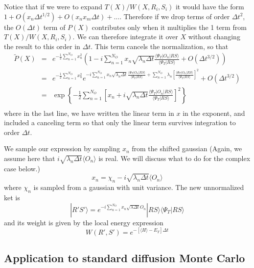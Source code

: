 Notice that if we were to expand $T(X)/W(X,R_i,S_i)$ it would
 have the form $1 + O(x_n\Delta t^{1/2}) + O(x_nx_m \Delta t)+ ...$.
 Therefore if we drop terms of order $\Delta t^2$, the $O(\Delta t)$ term of
 $P(X)$ contributes only when it multiplies the 1 term from $T(X)/W(X,R_i,S_i)$.
 We can therefore integrate it
 over $X$ without changing the result to this
 order in $\Delta t$. This term cancels the normalization, so that
 \begin{eqnarray}
 \tilde P(X) &=&
 e^{-\frac{1}{2} \sum_{n=1}^{N_O} x_n^2}
 \left (1 -i\sum_{n=1}^{N_O} x_n \sqrt{\lambda_n \Delta t}
 \frac{\langle \Psi_T|O_n|R S\rangle}
 {\langle \Psi_T|R S\rangle} + O(\Delta t^{3/2}) \right )
 \nonumber\\
 &=& e^{-\frac{1}{2} \sum_{n=1}^{N_O} x_n^2}
 e^{ -i\sum_{n=1}^{N_O} x_n \sqrt{\lambda_n \Delta t}
 	\frac{\langle \Psi_T|O_n|R S\rangle}{\langle \Psi_T|R S\rangle}
 	+\sum_{n=1}^{N_O} \lambda_n 
 	[\frac{\langle \Psi_T|O_n|R S\rangle}{\langle \Psi_T|R S\rangle}]^2}
 +O(\Delta t^{3/2})
 \nonumber\\
 &=&
 \exp\left \{-\frac{1}{2} \sum_{n=1}^{N_O} 
 \left [x_n+i\sqrt{\lambda_n \Delta t}
 \frac{\langle \Psi_T|O_n|R S\rangle}{\langle \Psi_T|R S\rangle}
 \right ]^2 \right \}
 \nonumber\\
 \end{eqnarray}
 where in the last line, we have written the linear term in $x$ in the
 exponent, and included a canceling term so that only
 the linear term survives integration to order $\Delta t$.
 
 We sample our expression by sampling $x_n$ from the shifted gaussian
 (Again, we assume here that
 $i\sqrt{\lambda_n \Delta t}\langle O_n \rangle$ is real.
 We will discuss what to do for the complex case below.)
 \begin{equation}
 x_n = \chi_n -i \sqrt{\lambda_n\Delta t} \langle O_n\rangle
 \end{equation}
 where $\chi_n$ is sampled from a gaussian with unit variance.
 The new unnormalized ket is
 \begin{equation}
 |R'S'\rangle = e^{-i\sum_{n=1}^{N_O} x_n\sqrt{\lambda \Delta t} O_n}
 |RS\rangle \langle \Psi_T |RS\rangle
 \end{equation}
 and its weight is given by the local energy expression
 \begin{equation}
 W(R',S') = e^{-[\langle H \rangle-E_T] \Delta t}
 \end{equation}
 
 \subsection{Application to standard diffusion Monte Carlo}
